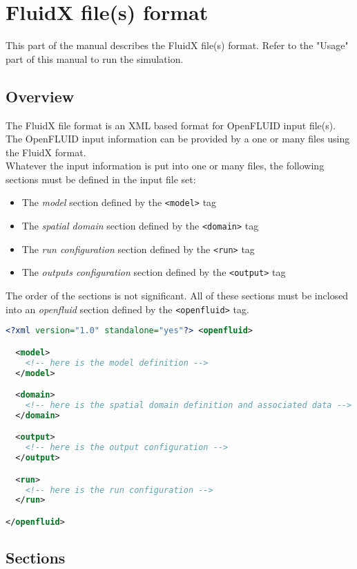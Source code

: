 \chapter{FluidX file(s) format}

This part of the manual describes the FluidX file(s) format. Refer to the "Usage"
part of this manual to run the simulation.

\section{Overview}

The FluidX file format is an XML based format for OpenFLUID input file(s).
The OpenFLUID input information can be provided by a one or many files using
the FluidX format.\\
Whatever the input information is put into one or many files, the following
sections must be defined in the input file set:
\begin{itemize}
  \item The \textit{model} section defined by the \texttt{<model>} tag
  \item The \textit{spatial domain} section defined by the \texttt{<domain>} tag
  \item The \textit{run configuration} section defined by the \texttt{<run>} tag
  \item The \textit{outputs configuration} section defined by the \texttt{<output>} tag  
\end{itemize}
The order of the sections is not significant. All of these sections must be
inclosed into an \textit{openfluid} section defined by the \texttt{<openfluid>}
tag.

\begin{lstlisting}[language=xml,title=\footnotesize\textit{summary view of the
XML tree for FluidX files}] <?xml version="1.0" standalone="yes"?> <openfluid>

  <model>
    <!-- here is the model definition -->
  </model>

  <domain>
    <!-- here is the spatial domain definition and associated data -->   
  </domain>

  <output>
    <!-- here is the output configuration -->
  </output>

  <run>
    <!-- here is the run configuration -->
  </run>

</openfluid>
\end{lstlisting}


\section{Sections}


